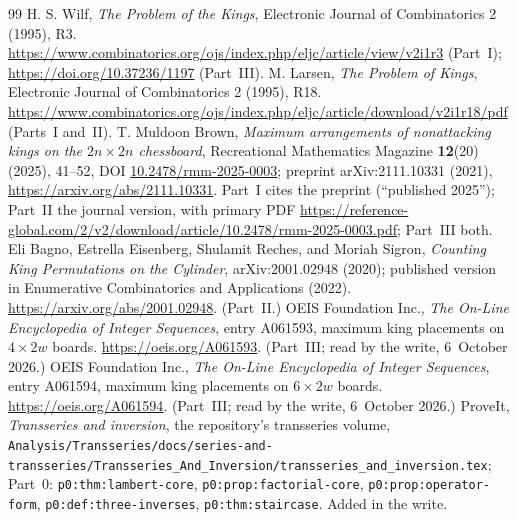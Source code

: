 \documentclass[11pt,letterpaper]{article}
\numberwithin{equation}{section}
\theoremstyle{remark}\newtheorem{remark}[theorem]{Remark}
\newcommand{\file}[1]{\nolinkurl{#1}}
\begin{document}
\begin{thebibliography}{99}
H. S. Wilf, \emph{The Problem of the Kings}, Electronic Journal of Combinatorics 2 (1995), R3. \url{https://www.combinatorics.org/ojs/index.php/eljc/article/view/v2i1r3} (Part~I); \url{https://doi.org/10.37236/1197} (Part~III).
M. Larsen, \emph{The Problem of Kings}, Electronic Journal of Combinatorics 2 (1995), R18. \url{https://www.combinatorics.org/ojs/index.php/eljc/article/download/v2i1r18/pdf} (Parts~I and~II).
T. Muldoon Brown, \emph{Maximum arrangements of nonattacking kings on the $2n\times2n$ chessboard}, Recreational Mathematics Magazine \textbf{12}(20) (2025), 41--52, DOI \href{https://doi.org/10.2478/rmm-2025-0003}{10.2478/rmm-2025-0003}; preprint arXiv:2111.10331 (2021), \url{https://arxiv.org/abs/2111.10331}. Part~I cites the preprint (``published 2025''); Part~II the journal version, with primary PDF \url{https://reference-global.com/2/v2/download/article/10.2478/rmm-2025-0003.pdf}; Part~III both.
Eli Bagno, Estrella Eisenberg, Shulamit Reches, and Moriah Sigron, \emph{Counting King Permutations on the Cylinder}, arXiv:2001.02948 (2020); published version in Enumerative Combinatorics and Applications (2022). \url{https://arxiv.org/abs/2001.02948}. (Part~II.)
OEIS Foundation Inc., \emph{The On-Line Encyclopedia of Integer Sequences}, entry A061593, maximum king placements on $4\times2w$ boards. \url{https://oeis.org/A061593}. (Part~III; read by the write, 6~October 2026.)
OEIS Foundation Inc., \emph{The On-Line Encyclopedia of Integer Sequences}, entry A061594, maximum king placements on $6\times2w$ boards. \url{https://oeis.org/A061594}. (Part~III; read by the write, 6~October 2026.)
ProveIt, \emph{Transseries and inversion}, the repository's transseries volume, \file{Analysis/Transseries/docs/series-and-transseries/Transseries_And_Inversion/transseries_and_inversion.tex}; Part~0: \file{p0:thm:lambert-core}, \file{p0:prop:factorial-core}, \file{p0:prop:operator-form}, \file{p0:def:three-inverses}, \file{p0:thm:staircase}. Added in the write.
\end{thebibliography}
\end{document}
